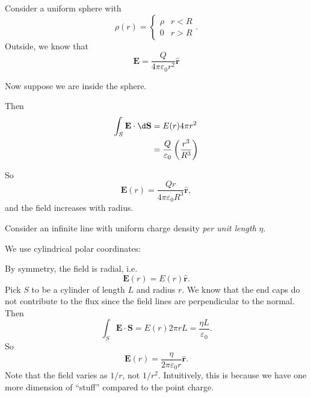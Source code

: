 \documentclass[a4paper]{article}
\begin{document}
\begin{eg}
  Consider a uniform sphere with
  \[
    \rho (r) = \begin{cases}
      \rho & r < R\\
      0 & r > R
    \end{cases}.
  \]
  Outside, we know that 
  \[
    \mathbf{E} = \frac{Q}{4\pi\varepsilon_0 r^2}\hat{\mathbf{r}}
  \]

  Now suppose we are inside the sphere.
   \begin{center}
  \end{center}

  Then
  \begin{align*}
    \int_S \mathbf{E}\cdot \d\mathbf{S} &= E(r) 4\pi r^2\\
    &= \frac{Q}{\varepsilon_0}\left(\frac{r^3}{R^3}\right)
  \end{align*}
  
  So 
  \[
    \mathbf{E}(r) = \frac{Qr}{4\pi\varepsilon_0 R^3}\hat{\mathbf{r}},
  \]
  and the field increases with radius. 
\end{eg}

\begin{eg}
  Consider an infinite line with uniform charge density \emph{per unit length} $\eta$.

  We use cylindrical polar coordinates:
  \begin{center}
  \end{center}

  By symmetry, the field is radial, i.e.
  \[
    \mathbf{E}(r) = E(r) \hat{\mathbf{r}}.
  \]
  Pick $S$ to be a cylinder of length $L$ and radius $r$. We know that the end caps do not contribute to the flux since the field lines are perpendicular to the normal. Then
  \[
    \int_S\mathbf{E}\cdot \mathbf{S} = E(r)2\pi rL = \frac{\eta L}{\varepsilon_0}.
  \]
  So
  \[
    \mathbf{E}(r) = \frac{\eta}{2\pi \varepsilon_0 r} \hat{\mathbf{r}}.
  \]
  Note that the field varies as $1/r$, not $1/r^2$. Intuitively, this is because we have one more dimension of ``stuff'' compared to the point charge. 
\end{eg}
\end{document}
